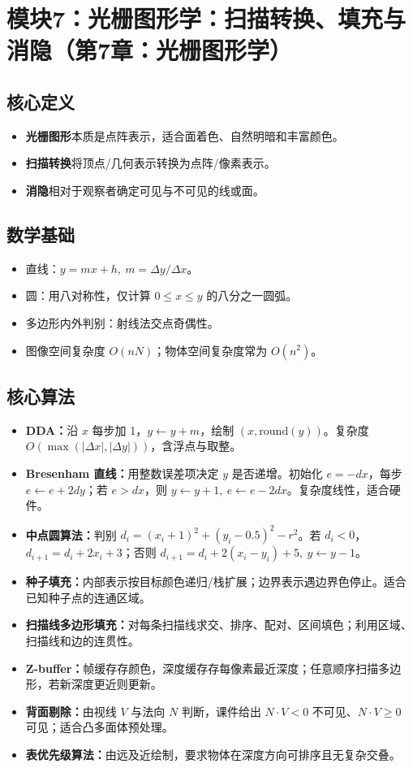 \documentclass[UTF8,fontset=fandol,11pt]{ctexart}
\newcommand{\key}[1]{\textbf{#1}}
\begin{document}
\section{模块7：光栅图形学：扫描转换、填充与消隐（第7章：光栅图形学）}
\subsection{核心定义}
\begin{itemize}
  \item \key{光栅图形}本质是点阵表示，适合面着色、自然明暗和丰富颜色。
  \item \key{扫描转换}将顶点/几何表示转换为点阵/像素表示。
  \item \key{消隐}相对于观察者确定可见与不可见的线或面。
\end{itemize}
\subsection{数学基础}
\begin{itemize}
  \item 直线：$y=mx+h,\ m=\Delta y/\Delta x$。
  \item 圆：用八对称性，仅计算 $0\le x\le y$ 的八分之一圆弧。
  \item 多边形内外判别：射线法交点奇偶性。
  \item 图像空间复杂度 $O(nN)$；物体空间复杂度常为 $O(n^2)$。
\end{itemize}
\subsection{核心算法}
\begin{itemize}
  \item \key{DDA：}沿 $x$ 每步加 1，$y\leftarrow y+m$，绘制 $(x,\mathrm{round}(y))$。复杂度 $O(\max(|\Delta x|,|\Delta y|))$，含浮点与取整。
  \item \key{Bresenham 直线：}用整数误差项决定 $y$ 是否递增。初始化 $e=-dx$，每步 $e\leftarrow e+2dy$；若 $e>dx$，则 $y\leftarrow y+1,\ e\leftarrow e-2dx$。复杂度线性，适合硬件。
  \item \key{中点圆算法：}判别 $d_i=(x_i+1)^2+(y_i-0.5)^2-r^2$。若 $d_i<0$，$d_{i+1}=d_i+2x_i+3$；否则 $d_{i+1}=d_i+2(x_i-y_i)+5,\ y\leftarrow y-1$。
  \item \key{种子填充：}内部表示按目标颜色递归/栈扩展；边界表示遇边界色停止。适合已知种子点的连通区域。
  \item \key{扫描线多边形填充：}对每条扫描线求交、排序、配对、区间填色；利用区域、扫描线和边的连贯性。
  \item \key{Z-buffer：}帧缓存存颜色，深度缓存存每像素最近深度；任意顺序扫描多边形，若新深度更近则更新。
  \item \key{背面剔除：}由视线 $V$ 与法向 $N$ 判断，课件给出 $N\cdot V<0$ 不可见、$N\cdot V\ge0$ 可见；适合凸多面体预处理。
  \item \key{表优先级算法：}由远及近绘制，要求物体在深度方向可排序且无复杂交叠。
\end{itemize}
\end{document}

